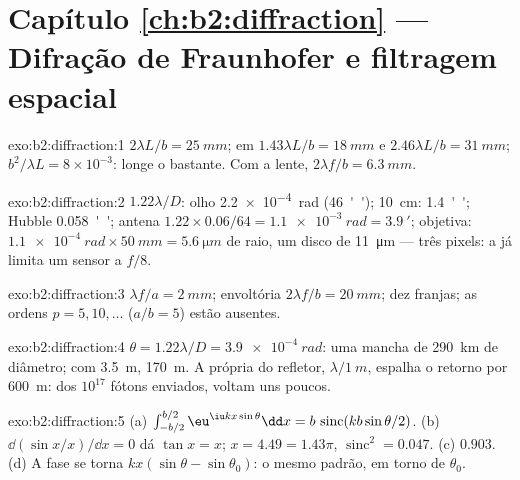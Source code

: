 \section*{Capítulo \ref{ch:b2:diffraction} --- Difração de Fraunhofer e filtragem espacial}

\begin{solution}{exo:b2:diffraction:1}
$2\lambda L/b = \qty{25}{mm}$;  em $1.43\lambda L/b = \qty{18}{mm}$ e
$2.46\lambda L/b = \qty{31}{mm}$;  $b^2/\lambda L = 8 \times 10^{-3}$: longe
o bastante. Com a lente, $2\lambda f/b = \qty{6.3}{mm}$.
\end{solution}

\begin{solution}{exo:b2:diffraction:2}
$1.22\lambda/D$: olho \qty{2.2e-4}{rad} (\qty{46}{''}); \qty{10}{cm}: \qty{1.4}{''}; Hubble
\qty{0.058}{''}; antena $1.22 \times 0.06/64 = \qty{1.1e-3}{rad} = \qty{3.9}{'}$; objetiva:
$\qty{1.1e-4}{rad} \times \qty{50}{mm} = \qty{5.6}{\micro m}$ de raio, um disco de \qty{11}{\micro m} ---
três pixels: a  já limita um sensor a $f/8$.
\end{solution}

\begin{solution}{exo:b2:diffraction:3}
$\lambda f/a = \qty{2}{mm}$; envoltória $2\lambda f/b = \qty{20}{mm}$; dez franjas; as ordens
$p = 5, 10, \dots$ ($a/b = 5$) estão ausentes.
\end{solution}

\begin{solution}{exo:b2:diffraction:4}
$\theta = 1.22\lambda/D = \qty{3.9e-4}{rad}$: uma mancha de \qty{290}{km} de diâmetro; com \qty{3.5}{m},
\qty{170}{m}. A própria  do refletor, $\lambda/\qty{1}{m}$, espalha o
retorno por \qty{600}{m}: dos $10^{17}$ fótons enviados, voltam uns poucos.
\end{solution}

\begin{solution}{exo:b2:diffraction:5}
(a) $\int_{-b/2}^{b/2}\eu^{\iu kx\sin\theta}\dd x = b\,\operatorname{sinc}(kb\sin\theta/2)$. (b)
$\dd(\sin x/x)/\dd x = 0$ dá $\tan x = x$; $x = 4.49 = 1.43\pi$, $\operatorname{sinc}^2 =
0.047$. (c) $0.903$. (d) A fase se torna $kx(\sin\theta - \sin\theta_0)$: o
mesmo padrão, em torno de $\theta_0$.
\end{solution}

